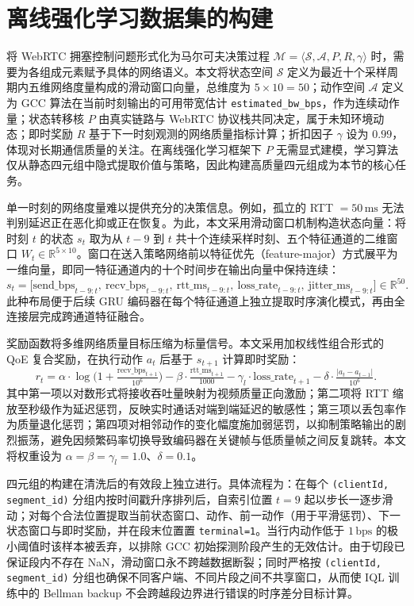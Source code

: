 \section{离线强化学习数据集的构建}
\label{sec:rl-dataset}

将 WebRTC 拥塞控制问题形式化为马尔可夫决策过程 $\mathcal{M} = \langle \mathcal{S}, \mathcal{A}, P, R, \gamma \rangle$ 时，需要为各组成元素赋予具体的网络语义。本文将状态空间 $\mathcal{S}$ 定义为最近十个采样周期内五维网络度量构成的滑动窗口向量，总维度为 $5 \times 10 = 50$；动作空间 $\mathcal{A}$ 定义为 GCC 算法在当前时刻输出的可用带宽估计 \texttt{estimated\_bw\_bps}，作为连续动作量；状态转移核 $P$ 由真实链路与 WebRTC 协议栈共同决定，属于未知环境动态；即时奖励 $R$ 基于下一时刻观测的网络质量指标计算；折扣因子 $\gamma$ 设为 $0.99$，体现对长期通信质量的关注。在离线强化学习框架下 $P$ 无需显式建模，学习算法仅从静态四元组中隐式提取价值与策略，因此构建高质量四元组成为本节的核心任务。

单一时刻的网络度量难以提供充分的决策信息。例如，孤立的 RTT $=50\,\text{ms}$ 无法判别延迟正在恶化抑或正在恢复。为此，本文采用滑动窗口机制构造状态向量：将时刻 $t$ 的状态 $s_t$ 取为从 $t-9$ 到 $t$ 共十个连续采样时刻、五个特征通道的二维窗口 $W_t \in \mathbb{R}^{5\times 10}$。窗口在送入策略网络前以特征优先（feature-major）方式展平为一维向量，即同一特征通道内的十个时间步在输出向量中保持连续：
\[
s_t = \big[\text{send\_bps}_{t-9:t},\ \text{recv\_bps}_{t-9:t},\ \text{rtt\_ms}_{t-9:t},\ \text{loss\_rate}_{t-9:t},\ \text{jitter\_ms}_{t-9:t}\big] \in \mathbb{R}^{50}.
\]
此种布局便于后续 GRU 编码器在每个特征通道上独立提取时序演化模式，再由全连接层完成跨通道特征融合。

奖励函数将多维网络质量目标压缩为标量信号。本文采用加权线性组合形式的 QoE 复合奖励，在执行动作 $a_t$ 后基于 $s_{t+1}$ 计算即时奖励：
\[
r_t = \alpha \cdot \log\!\Big(1 + \tfrac{\text{recv\_bps}_{t+1}}{10^6}\Big) - \beta \cdot \tfrac{\text{rtt\_ms}_{t+1}}{1000} - \gamma_l \cdot \text{loss\_rate}_{t+1} - \delta \cdot \tfrac{|a_t - a_{t-1}|}{10^6}.
\]
其中第一项以对数形式将接收吞吐量映射为视频质量正向激励；第二项将 RTT 缩放至秒级作为延迟惩罚，反映实时通话对端到端延迟的敏感性；第三项以丢包率作为质量退化惩罚；第四项对相邻动作的变化幅度施加弱惩罚，以抑制策略输出的剧烈振荡，避免因频繁码率切换导致编码器在关键帧与低质量帧之间反复跳转。本文将权重设为 $\alpha=\beta=\gamma_l=1.0$、$\delta=0.1$。

四元组的构建在清洗后的有效段上独立进行。具体流程为：在每个 \texttt{(clientId, segment\_id)} 分组内按时间戳升序排列后，自索引位置 $t = 9$ 起以步长一逐步滑动；对每个合法位置提取当前状态窗口、动作、前一动作（用于平滑惩罚）、下一状态窗口与即时奖励，并在段末位置置 \texttt{terminal=1}。当行内动作低于 $1\,\text{bps}$ 的极小阈值时该样本被丢弃，以排除 GCC 初始探测阶段产生的无效估计。由于切段已保证段内不存在 NaN，滑动窗口永不跨越数据断裂；同时严格按 \texttt{(clientId, segment\_id)} 分组也确保不同客户端、不同片段之间不共享窗口，从而使 IQL 训练中的 Bellman backup 不会跨越段边界进行错误的时序差分目标计算。

